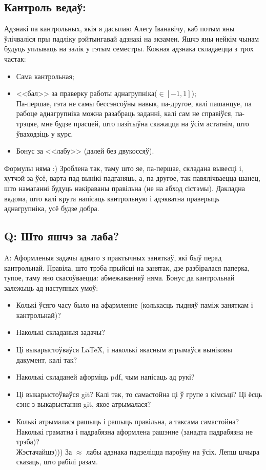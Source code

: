 	\subsection{Кантроль ведаў:}
	Адзнакі па кантрольных, якія я дасылаю Алегу Іванавічу, каб потым яны ўлічваліся пры падліку рэйтынгавай адзнакі на экзамен. Яшчэ яны нейкім чынам будуць уплываць на залік у гэтым семестры. Кожная адзнака складаецца з трох частак:
	\begin{itemize}
		\item Сама кантрольная;
		\item <<бал>> за праверку работы аднагрупніка($\in [-1, 1]$); \\[6pt]
		{Па-першае, гэта не самы бессэнсоўны навык, па-другое, калі пашанцуе, па рабоце аднагрупніка можна разабраць заданні, калі сам не справіўся, па-трэцяе, мне будзе прасцей, што пазітыўна скажацца на ўсім астатнім, што ўваходзіць у курс.}
		\item Бонус за <<лабу>> (далей без двукоссяў).
	\end{itemize}
	{Формулы няма :) Зроблена так, таму што яе, па-першае, складана вывесці і, хутчэй за ўсё, варта пад вынікі падганяць, а, па-другое, так павялічваецца шанец, што намаганні будуць накіраваны правільна (не на абход сістэмы). Дакладна вядома, што калі крута напісаць кантрольную і адэкватна праверыць аднагрупніка, усё будзе добра.}
	\subsection{Q: Што яшчэ за лаба?}
	{\large A:} Аформленыя задачы аднаго з практычных заняткаў, які быў перад кантрольнай. Правіла, што трэба прыйсці на занятак, дзе разбіралася паперка, тупое, таму яно скасоўваецца: абмежаванняў няма. Бонус да кантрольнай залежыць ад наступных умоў:
	\begin{itemize}
		\item Колькі ўсяго часу было на афармленне (колькасць тыдняў паміж заняткам і кантрольнай)?
		\item Наколькі складаныя задачы?
		\item Ці выкарыстоўваўся \LaTeX, і наколькі якасным атрымаўся выніковы дакумент, калі так?
		\item Наколькі складаней аформіць pdf, чым напісаць ад рукі?
		\item Ці выкарыстоўваўся git? Калі так, то самастойна ці ў групе з кімсьці? Ці ёсць сэнс з выкарыстання git, якое атрымалася?
		\item Колькі атрымалася рашыць і рашыць правільна, а таксама самастойна? Наколькі граматна і падрабязна аформлена рашэнне (занадта падрабязна не трэба)? \\[6pt]
		{Жэстачайшэ))) За $\approx$ лабы адзнака падзеліцца пароўну на ўсіх. Лепш шчыра сказаць, што рабілі разам.}
	\end{itemize}

